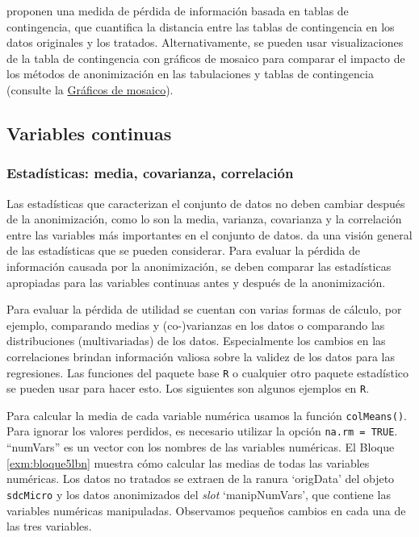 \documentclass[
]{book}
\theoremstyle{definition}
\theoremstyle{definition}
\theoremstyle{definition}
\theoremstyle{definition}
\theoremstyle{remark}
\begin{document}
\citep{domingo-ferrer2001}proponen una medida de pérdida de información basada en tablas de contingencia, que cuantifica la distancia entre las tablas de contingencia en los datos originales y los tratados.
Alternativamente, se pueden usar visualizaciones de la tabla de contingencia con gráficos de mosaico para comparar el impacto de los métodos de anonimización en las tabulaciones y tablas de contingencia (consulte la \protect\hyperlink{gruxe1ficos-de-mosaico}{Gráficos de mosaico}).

\hypertarget{variables-continuas}{%
\subsection{Variables continuas}\label{variables-continuas}}

\hypertarget{estaduxedsticas-media-covarianza-correlaciuxf3n}{%
\subsubsection{Estadísticas: media, covarianza, correlación}\label{estaduxedsticas-media-covarianza-correlaciuxf3n}}

Las estadísticas que caracterizan el conjunto de datos no deben cambiar después de la anonimización, como lo son la media, varianza, covarianza y la correlación entre las variables más importantes en el conjunto de
datos. \citep{domingo-ferrer2001} da una visión general de las estadísticas que se pueden considerar. Para evaluar la pérdida de información causada por la anonimización, se deben comparar las estadísticas apropiadas para las variables continuas antes y después de la anonimización.

Para evaluar la pérdida de utilidad se cuentan con varias formas de cálculo, por ejemplo, comparando medias y (co-)varianzas en los datos o comparando las distribuciones (multivariadas) de los datos. Especialmente los cambios en las correlaciones brindan información valiosa sobre la validez de los datos para las regresiones. Las
funciones del paquete base \texttt{R} o cualquier otro paquete estadístico se pueden usar para hacer esto. Los siguientes son algunos ejemplos en \texttt{R}.

Para calcular la media de cada variable numérica usamos la función \texttt{colMeans()}. Para ignorar los valores perdidos, es necesario utilizar la opción \texttt{na.rm\ =\ TRUE}. ``numVars'' es un vector con los nombres de las variables numéricas. El Bloque \ref{exm:bloque5lbn} muestra cómo calcular las medias de todas las variables numéricas. Los datos no tratados se extraen de la ranura `origData' del objeto \texttt{sdcMicro} y los datos anonimizados del \emph{slot} `manipNumVars', que contiene las variables numéricas manipuladas. Observamos pequeños cambios en cada una de las tres variables.
\end{document}
